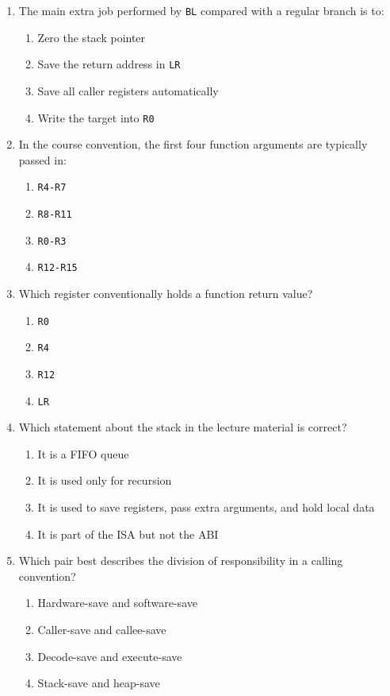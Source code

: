 \documentclass[11pt]{article}
\begin{document}
\begin{enumerate}[label=\textbf{A\arabic*.}]
  \item The main extra job performed by \texttt{BL} compared with a regular branch is to:
  \begin{enumerate}[label=(\Alph*)]
    \item Zero the stack pointer
    \item Save the return address in \texttt{LR}
    \item Save all caller registers automatically
    \item Write the target into \texttt{R0}
  \end{enumerate}

  \item In the course convention, the first four function arguments are typically passed in:
  \begin{enumerate}[label=(\Alph*)]
    \item \texttt{R4-R7}
    \item \texttt{R8-R11}
    \item \texttt{R0-R3}
    \item \texttt{R12-R15}
  \end{enumerate}

  \item Which register conventionally holds a function return value?
  \begin{enumerate}[label=(\Alph*)]
    \item \texttt{R0}
    \item \texttt{R4}
    \item \texttt{R12}
    \item \texttt{LR}
  \end{enumerate}

  \item Which statement about the stack in the lecture material is correct?
  \begin{enumerate}[label=(\Alph*)]
    \item It is a FIFO queue
    \item It is used only for recursion
    \item It is used to save registers, pass extra arguments, and hold local data
    \item It is part of the ISA but not the ABI
  \end{enumerate}

  \item Which pair best describes the division of responsibility in a calling convention?
  \begin{enumerate}[label=(\Alph*)]
    \item Hardware-save and software-save
    \item Caller-save and callee-save
    \item Decode-save and execute-save
    \item Stack-save and heap-save
  \end{enumerate}


\end{enumerate}
\end{document}
